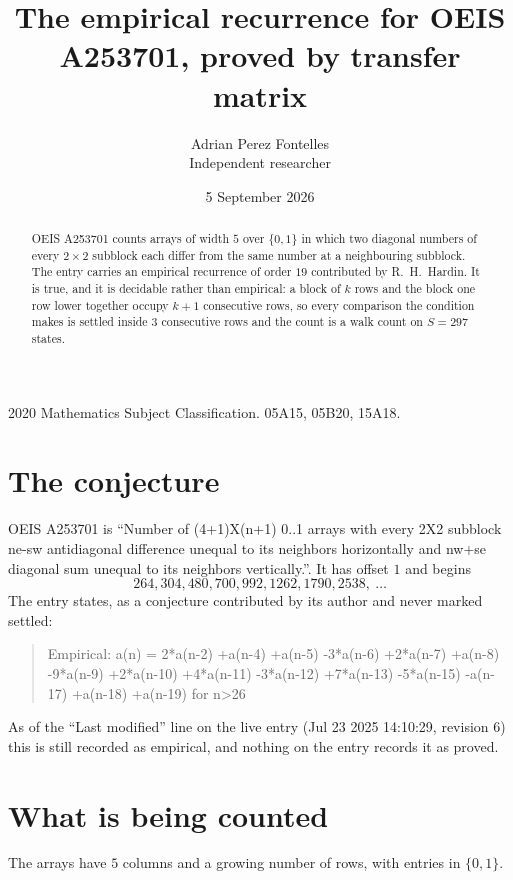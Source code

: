 \documentclass[11pt,a4paper]{article}
\title{The empirical recurrence for OEIS A253701, proved by transfer matrix}
\author{Adrian Perez Fontelles\\ \small Independent researcher}
\date{5 September 2026}
\theoremstyle{plain}
\theoremstyle{definition}
\begin{document}
\maketitle

\begin{abstract}
OEIS A253701 counts arrays of width $5$ over $\{0,1\}$ in which two diagonal numbers of every $2\times2$ subblock each differ from the same number at a neighbouring subblock. The entry carries an
empirical recurrence of order $19$ contributed by R.~H.~Hardin. It is true, and it is
decidable rather than empirical: a block of $k$ rows and the block one row lower together
occupy $k+1$ consecutive rows, so every comparison the condition makes is settled inside
$3$ consecutive rows and the count is a walk count on $S=297$ states.
\end{abstract}

\noindent\small 2020 Mathematics Subject Classification. 05A15, 05B20, 15A18.\normalsize

\section{The conjecture}

OEIS A253701 is ``Number of (4+1)X(n+1) 0..1 arrays with every 2X2 subblock ne-sw antidiagonal difference unequal to its neighbors horizontally and nw+se diagonal sum unequal to its neighbors vertically.''. It has offset $1$ and begins
\[
264, 304, 480, 700, 992, 1262, 1790, 2538,\ \dots
\]
The entry states, as a conjecture contributed by its author and never marked settled:
\begin{quote}
Empirical: a(n) = 2*a(n-2) +a(n-4) +a(n-5) -3*a(n-6) +2*a(n-7) +a(n-8) -9*a(n-9) +2*a(n-10) +4*a(n-11) -3*a(n-12) +7*a(n-13) -5*a(n-15) -a(n-17) +a(n-18) +a(n-19) for n>26
\end{quote}
As of the ``Last modified'' line on the live entry (Jul 23 2025 14:10:29, revision 6) this is still
recorded as empirical, and nothing on the entry records it as proved.

\section{What is being counted}

The arrays have $5$ columns and a growing number of rows, with entries in $\{0,1\}$.
\end{document}

